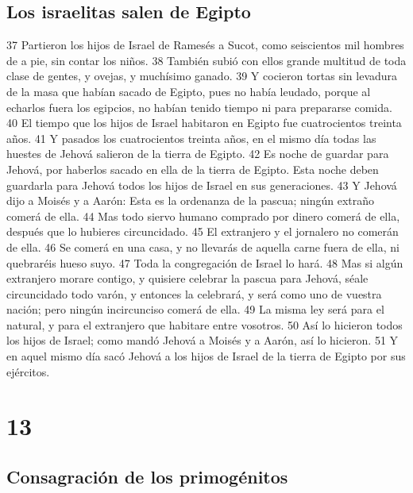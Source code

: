 \section*{Los israelitas salen de Egipto}

37 Partieron los hijos de Israel de Ramesés a Sucot, como seiscientos mil hombres de a pie, sin contar los niños.
38 También subió con ellos grande multitud de toda clase de gentes, y ovejas, y muchísimo ganado.
39 Y cocieron tortas sin levadura de la masa que habían sacado de Egipto, pues no había leudado, porque al echarlos fuera los egipcios, no habían tenido tiempo ni para prepararse comida.
40 El tiempo que los hijos de Israel habitaron en Egipto fue cuatrocientos treinta años.
41 Y pasados los cuatrocientos treinta años, en el mismo día todas las huestes de Jehová salieron de la tierra de Egipto.
42 Es noche de guardar para Jehová, por haberlos sacado en ella de la tierra de Egipto. Esta noche deben guardarla para Jehová todos los hijos de Israel en sus generaciones.
43 Y Jehová dijo a Moisés y a Aarón: Esta es la ordenanza de la pascua; ningún extraño comerá de ella.
44 Mas todo siervo humano comprado por dinero comerá de ella, después que lo hubieres circuncidado.
45 El extranjero y el jornalero no comerán de ella.
46 Se comerá en una casa, y no llevarás de aquella carne fuera de ella, ni quebraréis hueso suyo.
47 Toda la congregación de Israel lo hará.
48 Mas si algún extranjero morare contigo, y quisiere celebrar la pascua para Jehová, séale circuncidado todo varón, y entonces la celebrará, y será como uno de vuestra nación; pero ningún incircunciso comerá de ella.
49 La misma ley será para el natural, y para el extranjero que habitare entre vosotros.
50 Así lo hicieron todos los hijos de Israel; como mandó Jehová a Moisés y a Aarón, así lo hicieron.
51 Y en aquel mismo día sacó Jehová a los hijos de Israel de la tierra de Egipto por sus ejércitos.

\chapter{13}

\section*{Consagración de los primogénitos}

